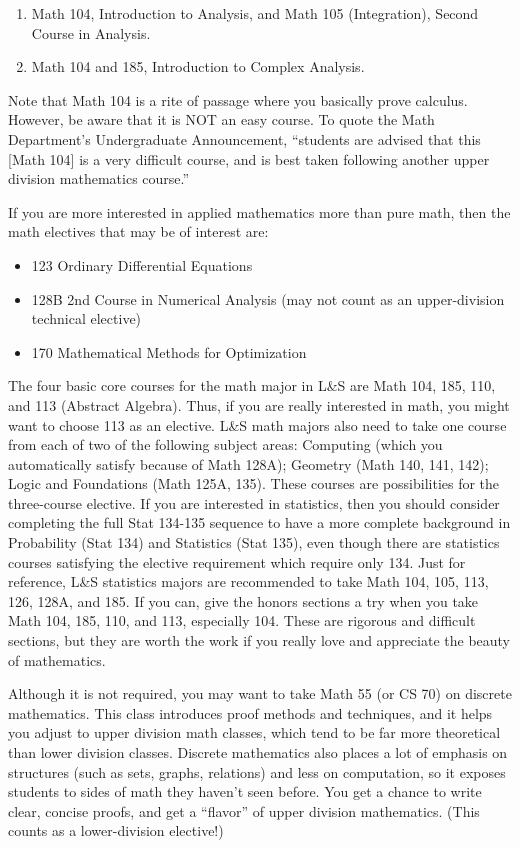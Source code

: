 \begin{enumerate}
  \item Math 104, Introduction to Analysis, and Math 105 (Integration), Second Course in Analysis.
  \item Math 104 and 185, Introduction to Complex Analysis.
\end{enumerate}

Note that Math 104 is a rite of passage where you basically prove calculus. However, be aware that it is NOT an easy course. To quote the Math Department’s Undergraduate Announcement, “students are advised that this [Math 104] is a very difficult course, and is best taken following another upper division mathematics course.”

If you are more interested in applied mathematics more than pure math, then the math electives that may be of interest are:

\begin{itemize}
  \item 123 Ordinary Differential Equations
  \item 128B 2nd Course in Numerical Analysis (may not count as an upper-division technical elective)
  \item 170 Mathematical Methods for Optimization
\end{itemize}

The four basic core courses for the math major in L\&S are Math 104, 185, 110, and 113 (Abstract Algebra). Thus, if you are really interested in math, you might want to choose 113 as an elective. L\&S math majors also need to take one course from each of two of the following subject areas: Computing (which you automatically satisfy because of Math 128A); Geometry (Math 140, 141, 142); Logic and Foundations (Math 125A, 135). These courses are possibilities for the three-course elective. If you are interested in statistics, then you should consider completing the full Stat 134-135 sequence to have a more complete background in Probability (Stat 134) and Statistics (Stat 135), even though there are statistics courses satisfying the elective requirement which require only 134. Just for reference, L\&S statistics majors are recommended to take Math 104, 105, 113, 126, 128A, and 185. If you can, give the honors sections a try when you take Math 104, 185, 110, and 113, especially 104. These are rigorous and difficult sections, but they are worth the work if you really love and appreciate the beauty of mathematics.

Although it is not required, you may want to take Math 55 (or CS 70) on discrete mathematics. This class introduces proof methods and techniques, and it helps you adjust to upper division math classes, which tend to be far more theoretical than lower division classes. Discrete mathematics also places a lot of emphasis on structures (such as sets, graphs, relations) and less on computation, so it exposes students to sides of math they haven't seen before. You get a chance to write clear, concise proofs, and get a “flavor” of upper division mathematics. (This counts as a lower-division elective!)


